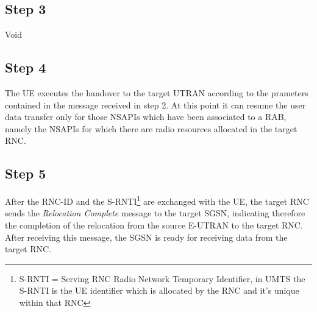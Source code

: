 \subsection*{Step 3}
Void




\subsection*{Step 4}
The UE executes the handover to the target UTRAN according to the prameters
contained in the message received in step 2. At this point it can resume the user
data transfer only for those NSAPIs which have been associated to a RAB, namely
the NSAPIs for which there are radio resources allocated in the target RNC.




\subsection*{Step 5}
After the RNC-ID and the S-RNTI\footnote{S-RNTI = Serving RNC Radio Network
Temporary Identifier, in UMTS the S-RNTI is the UE identifier which is allocated
by the RNC and it's unique within that RNC} are exchanged with the UE, the target
RNC sends the \emph{Relocation Complete} message to the target SGSN, indicating
therefore the completion of the relocation from the source E-UTRAN to the target
RNC. After receiving this message, the SGSN is ready for receiving data from
the target RNC. 
